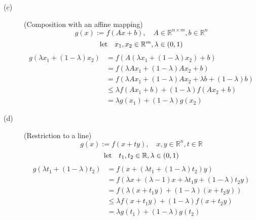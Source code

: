 \documentclass[11pt]{article}
\begin{document}
\begin{description}
\begin{description}
    \item[(c)] (Composition with an affine mapping)
    \begin{equation*}
        g(x):= f(Ax+b), \quad A \in \mathbb{R}^{n \times m}, b \in \mathbb{R}^n
    \end{equation*}
    \begin{equation*}
        \text{let} \quad x_1,x_2 \in \mathbb{R}^m, \lambda \in (0,1) \\
    \end{equation*}
    \begin{equation*}
        \begin{aligned}
            g(\lambda x_1 + (1-\lambda)x_2)
            &= f(A(\lambda x_1 + (1-\lambda)x_2) + b) \\
            &= f(\lambda Ax_1 + (1-\lambda)Ax_2 + b) \\
            &= f(\lambda Ax_1 + (1-\lambda)Ax_2 + \lambda b + (1-\lambda) b) \\
            &\leq \lambda f(Ax_1 + b) + (1-\lambda)f(Ax_2 + b) \\
            &= \lambda g(x_1) + (1-\lambda) g(x_2)
        \end{aligned}
    \end{equation*}

    \item[(d)] (Restriction to a line)
    \begin{equation*}
        g(x):= f(x+ty), \quad x,y \in \mathbb{R}^n, t \in \mathbb{R}
    \end{equation*}
    \begin{equation*}
        \text{let} \quad t_1,t_2 \in \mathbb{R}, \lambda \in (0,1) \\
    \end{equation*}
    \begin{equation*}
        \begin{aligned}
            g(\lambda t_1 + (1-\lambda)t_2)
            &= f(x + (\lambda t_1 + (1-\lambda)t_2)y) \\
            &= f(\lambda x + (\lambda - 1) x + \lambda t_1 y + (1-\lambda)t_2 y) \\
            &= f(\lambda(x + t_1y) + (1-\lambda)(x + t_2y)) \\
            &\leq \lambda f(x + t_1y) + (1-\lambda)f(x + t_2y) \\
            &= \lambda g(t_1) + (1-\lambda) g(t_2)
        \end{aligned}
    \end{equation*}


\end{description}
\end{description}
\end{document}
